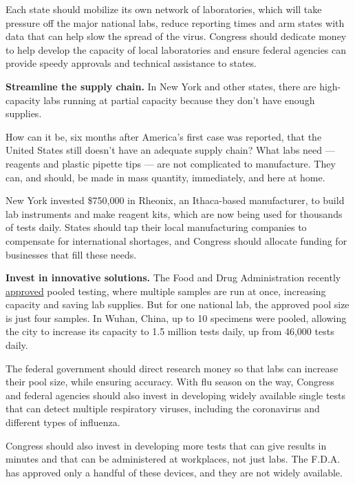 Each state should mobilize its own network of laboratories, which will
take pressure off the major national labs, reduce reporting times and
arm states with data that can help slow the spread of the virus.
Congress should dedicate money to help develop the capacity of local
laboratories and ensure federal agencies can provide speedy approvals
and technical assistance to states.

\textbf{Streamline the supply chain.} In New York and other states,
there are high-capacity labs running at partial capacity because they
don't have enough supplies.

How can it be, six months after America's first case was reported, that
the United States still doesn't have an adequate supply chain? What labs
need --- reagents and plastic pipette tips --- are not complicated to
manufacture. They can, and should, be made in mass quantity,
immediately, and here at home.

New York invested \$750,000 in Rheonix, an Ithaca-based manufacturer, to
build lab instruments and make reagent kits, which are now being used
for thousands of tests daily. States should tap their local
manufacturing companies to compensate for international shortages, and
Congress should allocate funding for businesses that fill these needs.

\textbf{Invest in innovative solutions.} The Food and Drug
Administration recently
\href{https://www.fda.gov/news-events/press-announcements/coronavirus-covid-19-update-fda-issues-first-emergency-authorization-sample-pooling-diagnostic}{approved}
pooled testing, where multiple samples are run at once, increasing
capacity and saving lab supplies. But for one national lab, the approved
pool size is just four samples. In Wuhan, China, up to 10 specimens were
pooled, allowing the city to increase its capacity to 1.5 million tests
daily, up from 46,000 tests daily.

The federal government should direct research money so that labs can
increase their pool size, while ensuring accuracy. With flu season on
the way, Congress and federal agencies should also invest in developing
widely available single tests that can detect multiple respiratory
viruses, including the coronavirus and different types of influenza.

Congress should also invest in developing more tests that can give
results in minutes and that can be administered at workplaces, not just
labs. The F.D.A. has approved only a handful of these devices, and they
are not widely available.

